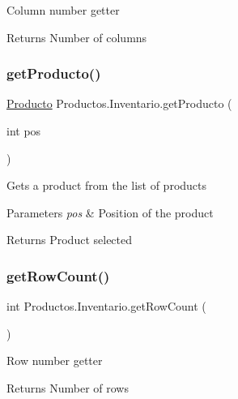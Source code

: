 Column number getter \begin{DoxyReturn}{Returns}
Number of columns 
\end{DoxyReturn}
\mbox{\label{class_productos_1_1_inventario_adedc7e3eac62bbbc20bff33ffa9503f0}} 
\subsubsection{\texorpdfstring{get\+Producto()}{getProducto()}}
{\footnotesize\ttfamily \mbox{\hyperlink{class_productos_1_1_producto}{Producto}} Productos.\+Inventario.\+get\+Producto (\begin{DoxyParamCaption}\item[{int}]{pos }\end{DoxyParamCaption})\hspace{0.3cm}{\ttfamily [inline]}}

Gets a product from the list of products 
\begin{DoxyParams}{Parameters}
{\em pos} & Position of the product \\
\hline
\end{DoxyParams}
\begin{DoxyReturn}{Returns}
Product selected 
\end{DoxyReturn}
\mbox{\label{class_productos_1_1_inventario_ae299062aacb44852791e08833810e8bf}} 
\subsubsection{\texorpdfstring{get\+Row\+Count()}{getRowCount()}}
{\footnotesize\ttfamily int Productos.\+Inventario.\+get\+Row\+Count (\begin{DoxyParamCaption}{ }\end{DoxyParamCaption})\hspace{0.3cm}{\ttfamily [inline]}}

Row number getter \begin{DoxyReturn}{Returns}
Number of rows 
\end{DoxyReturn}
\mbox{\label{class_productos_1_1_inventario_a79bccc9036dee4d92518ea4b21b3de3d}} 
